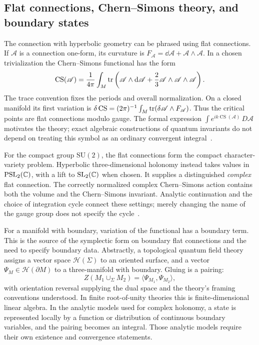 \subsection{Flat connections, Chern--Simons theory, and boundary states}
\label{sec:introCS}

The connection with hyperbolic geometry can be phrased using flat
connections. If $\mathscr A$ is a connection one-form, its curvature
is $F_{\mathscr A}=\dd\mathscr A+\mathscr A\wedge\mathscr A$.
In a chosen trivialization the Chern--Simons functional has the form
\begin{equation}
 \operatorname{CS}(\mathscr A)=\frac1{4\pi}\int_M
   \operatorname{tr}\left(\mathscr A\wedge\mathop{}\!\mathrm d\mathscr A
                    +\frac23\mathscr A\wedge\mathscr A\wedge\mathscr A\right).
 \label{eq:introCSfunctional}
\end{equation}
The trace convention fixes the periods and overall normalization.
On a closed manifold its first variation is
$\delta\operatorname{CS}=(2\pi)^{-1}\int_M
\operatorname{tr}(\delta\mathscr A\wedge F_{\mathscr A})$.
Thus the critical points are flat connections modulo gauge.
The formal expression
$\int e^{ik\operatorname{CS}(\mathscr A)}\,D\mathscr A$
motivates the theory; exact algebraic constructions of quantum
invariants do not depend on treating this symbol as an ordinary
convergent integral~\cite{WittenJones}.

For the compact group $\mathrm{SU}(2)$, the flat connections form
the compact character-variety problem. Hyperbolic three-dimensional
holonomy instead takes values in $\mathrm{PSL}_2(\mathbb C)$, with a lift
to $\mathrm{SL}_2(\mathbb C)$ when chosen. It supplies a distinguished
\emph{complex} flat connection. The correctly normalized complex
Chern--Simons action contains both the volume and the Chern--Simons
invariant. Analytic continuation and the choice of integration
cycle connect these settings; merely changing the name of the
gauge group does not specify the cycle~\cite{GukovApoly,WittenContinuation}.

For a manifold with boundary, variation of the functional has a
boundary term. This is the source of the symplectic form on boundary
flat connections and the need to specify boundary data. Abstractly,
a topological quantum field theory assigns a vector space
$\mathcal H(\Sigma)$ to an oriented surface, and a vector
$\Psi_M\in\mathcal H(\partial M)$ to a three-manifold with boundary.
Gluing is a pairing:
\[
 Z(M_1\cup_\Sigma M_2)=\langle\Psi_{M_1},\Psi_{M_2}\rangle,
\]
with orientation reversal supplying the dual space and the theory's
framing conventions understood. In finite root-of-unity theories
this is finite-dimensional linear algebra. In the analytic models
used for complex holonomy, a state is represented locally by a
function or distribution of continuous boundary variables, and
the pairing becomes an integral. Those analytic models require
their own existence and convergence statements.

